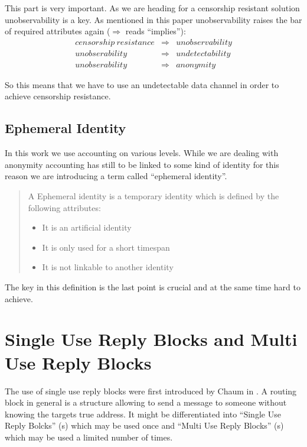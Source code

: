 This part is very important. As we are heading for a censorship resistant solution unobservability is a key. As mentioned in this paper unobservability raises the bar of required attributes again ($\Rightarrow$ reads ``implies''):
\begin{eqnarray*}
	censorship\ resistance & \Rightarrow & unobservability\\
	unobserability         & \Rightarrow & undetectability\\
	unobserability         & \Rightarrow & anonymity
\end{eqnarray*}

So this means that we have to use an undetectable data channel in order to achieve censorship resistance.

\subsection{Ephemeral Identity}
In this work we use accounting on various levels. While we are dealing with anonymity accounting has still to be linked to some kind of identity for this reason we are introducing a term called ``ephemeral identity''.

\begin{quote}
	A Ephemeral identity is a temporary identity which is defined by the following attributes:
	\begin{itemize}
		\item It is an artificial identity
		\item It is only used for a short timespan
		\item It is not linkable to another identity
	\end{itemize}
\end{quote}

The key in this definition is the last point is crucial and at the same time hard to achieve.

\section{Single Use Reply Blocks and Multi Use Reply Blocks}
The use of single use reply blocks were first introduced by Chaum in \cite{CHAUM1}. A routing block in general is a structure allowing to send a message to someone without knowing the targets true address. It might be differentiated into ``Single Use Reply Bolcks'' (s) which may be used once and ``Multi Use Reply Blocks'' (s) which may be used a limited number of times. 

